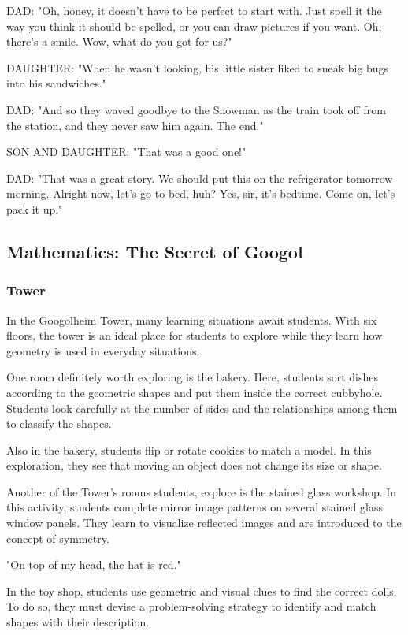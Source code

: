 DAD: "Oh, honey, it doesn't have to be perfect to start with.
Just spell it the way you think it should be spelled, or you can draw pictures if you want.
Oh, there's a smile.
Wow, what do you got for us?"

DAUGHTER: "When he wasn't looking, his little sister liked to sneak big bugs into his sandwiches."

DAD: "And so they waved goodbye to the Snowman as the train took off from the station, and they never saw him again.
The end."

SON AND DAUGHTER: "That was a good one!"

DAD: "That was a great story.
We should put this on the refrigerator tomorrow morning.
Alright now, let's go to bed, huh?
Yes, sir, it's bedtime. Come on, let's pack it up."

\subsection{Mathematics: The Secret of Googol}

\subsubsection{Tower}

In the Googolheim Tower, many learning situations await students.
With six floors, the tower is an ideal place for students to explore while they learn how geometry is used in everyday situations.

One room definitely worth exploring is the bakery.
Here, students sort dishes according to the geometric shapes and put them inside the correct cubbyhole.
Students look carefully at the number of sides and the relationships among them to classify the shapes.

Also in the bakery, students flip or rotate cookies to match a model.
In this exploration, they see that moving an object does not change its size or shape.

Another of the Tower's rooms students, explore is the stained glass workshop.
In this activity, students complete mirror image patterns on several stained glass window panels.
They learn to visualize reflected images and are introduced to the concept of symmetry.

"On top of my head, the hat is red."

In the toy shop, students use geometric and visual clues to find the correct dolls.
To do so, they must devise a problem-solving strategy to identify and match shapes with their description.

